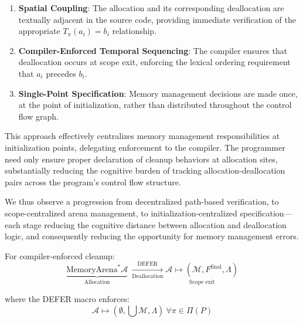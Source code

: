\begin{enumerate}
	\item \textbf{Spatial Coupling}: The allocation and its corresponding deallocation are textually adjacent in the source code, providing immediate verification of the appropriate $T_{\pi}(a_i) = b_i$ relationship.

	\item \textbf{Compiler-Enforced Temporal Sequencing}: The compiler ensures that deallocation occurs at scope exit, enforcing the lexical ordering requirement that $a_i$ precedes $b_i$.

	\item \textbf{Single-Point Specification}: Memory management decisions are made once, at the point of initialization, rather than distributed throughout the control flow graph.
\end{enumerate}

\indent
\begin{raggedright}
	This approach effectively centralizes memory management responsibilities at initialization points, delegating enforcement to the compiler. The programmer need only ensure proper declaration of cleanup behaviors at allocation sites, substantially reducing the cognitive burden of tracking allocation-deallocation pairs across the program's control flow structure.
\end{raggedright}

We thus observe a progression from decentralized path-based verification, to scope-centralized arena management, to initialization-centralized specification—each stage reducing the cognitive distance between allocation and deallocation logic, and consequently reducing the opportunity for memory management errors.

For compiler-enforced cleanup:
\[
	\underset{\text{Allocation}}{\underbrace{\text{MemoryArena}^* \mathcal{A}}}
	\ \underset{\text{Deallocation}}{\xrightarrow{\text{DEFER}}}
	\underset{\text{Scope exit}}{\mathcal{A} \mapsto (\mathcal{M}, F^{\text{final}}, \Lambda)}
\]

where the DEFER macro enforces:
\[
	\mathcal{A} \mapsto (\emptyset, \bigcup \mathcal{M}, \Lambda)\ \forall \pi \in \Pi(P)
\]

\newpage
